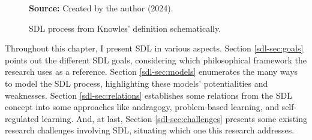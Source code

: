 \begin{figure}[ht!]
\centering

\caption{\textmd{\acrshort{SDL} process from Knowles’ definition schematically.}}
\label{fig:sdl-process}

\par\medskip\ABNTEXfontereduzida\selectfont\textbf{Source:} Created by the author (2024).
\end{figure}

Throughout this chapter, I present \gls{SDL} in various aspects. Section \ref{sdl-sec:goals} points out the different \gls{SDL} goals, considering which philosophical framework the research uses as a reference. Section \ref{sdl-sec:models} enumerates the many ways to model the \gls{SDL} process, highlighting these models’ potentialities and weaknesses. Section \ref{sdl-sec:relations} establishes some relations from the \gls{SDL} concept into some approaches like andragogy, problem-based learning, and self-regulated learning. And, at last, Section \ref{sdl-sec:challenges} presents some existing research challenges involving \gls{SDL}, situating which one this research addresses.
